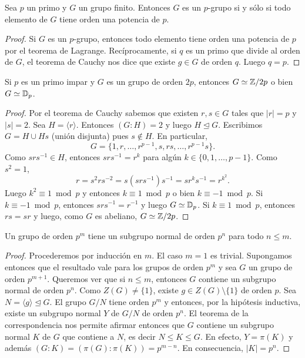 \begin{corollary}
	Sea $p$ un primo y $G$ un grupo finito. Entonces $G$ es un $p$-grupo si y sólo si todo elemento de $G$ tiene orden una potencia de $p$. 
\end{corollary}

\begin{proof}
Si $G$ es un $p$-grupo, entonces todo elemento tiene orden una potencia de $p$ por el teorema de Lagrange. Recíprocamente, si $q$ es un primo que divide al orden de $G$, el teorema
de Cauchy nos dice que existe $g\in G$ de orden $q$. Luego $q=p$. 	
\end{proof}

\begin{corollary}
Si $p$ es un primo impar y $G$ es un grupo de orden $2p$, entonces $G\simeq\mathbb{Z}/2p$ o bien $G\simeq\mathbb{D}_p$. 	
\end{corollary}

\begin{proof}
Por el teorema de Cauchy sabemos que existen $r,s\in G$ tales que $|r|=p$ y $|s|=2$. Sea $H=\langle r\rangle$. Entonces $(G:H)=2$ y luego $H\unlhd G$. Escribimos $G=H\cup Hs$ (unión disjunta) pues $s\not\in H$.
En particular,  
\[
G=\{1,r,\dots,r^{p-1},s,rs,\dots,r^{p-1}s\}.
\]
Como $srs^{-1}\in H$, entonces $srs^{-1}=r^k$ para algún $k\in\{0,1,\dots,p-1\}$. Como $s^2=1$,
\[
r=s^2rs^{-2}=s(srs^{-1})s^{-1}=sr^ks^{-1}=r^{k^2}.
\]	
Luego $k^2\equiv 1\bmod p$ y entonces $k\equiv 1\bmod p$ o bien $k\equiv -1\bmod p$. Si $k\equiv -1\bmod p$, entonces $srs^{-1}=r^{-1}$ y luego $G\simeq\mathbb{D}_p$. 
Si $k\equiv 1\bmod p$, entonces $rs=sr$ y luego, como $G$ es abeliano, $G\simeq\mathbb{Z}/{2p}$.
\end{proof}

\begin{theorem}
	Un grupo de orden $p^m$ tiene un subgrupo normal de orden $p^n$ para todo $n\leq m$. 
\end{theorem}

\begin{proof}
Procederemos por inducción en $m$. El caso $m=1$ es trivial. Supongamos entonces que el resultado vale para los grupos de orden $p^m$ y sea $G$ un grupo de orden $p^{m+1}$. 
Queremos ver que si $n\leq m$, entonces $G$ contiene un subgrupo normal de orden $p^n$. Como $Z(G)\ne\{1\}$, existe $g\in Z(G)\setminus\{1\}$ de orden $p$. Sea 
$N=\langle g\rangle\unlhd G$. El grupo $G/N$ tiene orden $p^m$ y entonces, por la hipótesis inductiva, existe un subgrupo normal $Y$ de $G/N$ de orden $p^n$. El teorema de la correspondencia
nos permite afirmar entonces que $G$ contiene un subgrupo normal $K$ de $G$ que contiene a $N$, es decir $N\leq K\leq G$. En efecto, $Y=\pi(K)$ y además 
$(G:K)=(\pi(G):\pi(K))=p^{m-n}$. En consecuencia, $|K|=p^n$.   
\end{proof}


